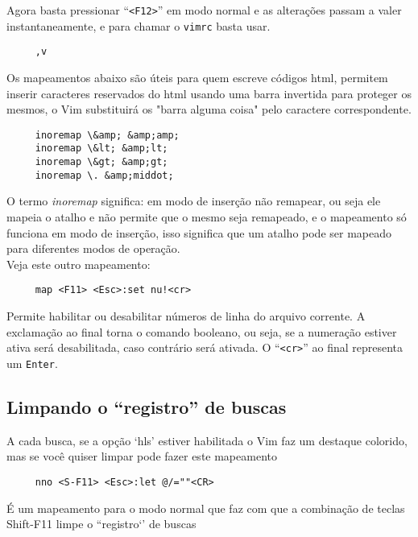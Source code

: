 Agora basta pressionar ``\verb|<F12>|'' em modo normal e as alterações passam a valer
instantaneamente, e para chamar o {\tt vimrc} basta usar.

\begin{verbatim}
     ,v
\end{verbatim}



Os mapeamentos abaixo são úteis
para quem escreve códigos html, permitem inserir caracteres reservados do html
usando uma barra invertida para proteger os mesmos, o Vim substituirá os "barra
alguma coisa" pelo caractere correspondente.

\begin{verbatim}
     inoremap \&amp; &amp;amp;
     inoremap \&lt; &amp;lt;
     inoremap \&gt; &amp;gt;
     inoremap \. &amp;middot;
\end{verbatim}

O termo {\em inoremap} significa: em modo de inserção não remapear, ou seja
ele mapeia o atalho e não permite que o mesmo seja remapeado, e o
mapeamento só funciona em modo de inserção, isso significa que um atalho
pode ser mapeado para diferentes modos de operação. \\


Veja este outro mapeamento:

\begin{verbatim}
     map <F11> <Esc>:set nu!<cr>
\end{verbatim}

Permite habilitar ou desabilitar números de linha do arquivo corrente.
A exclamação ao final torna o comando booleano, ou seja, se a
numeração estiver ativa será desabilitada, caso contrário será
ativada. O ``\verb|<cr>|'' ao final representa um {\tt Enter}.

\subsection{Limpando o ``registro'' de buscas}\label{Limpando o ``registro'' de buscas}

A cada busca, se a opção `hls' estiver habilitada o Vim faz um
destaque colorido, mas se você quiser limpar pode fazer este
mapeamento

\begin{verbatim}
     nno <S-F11> <Esc>:let @/=""<CR>
\end{verbatim}

É um mapeamento para o modo normal que faz com que a combinação de
teclas Shift-F11 limpe o ``registro`' de buscas

